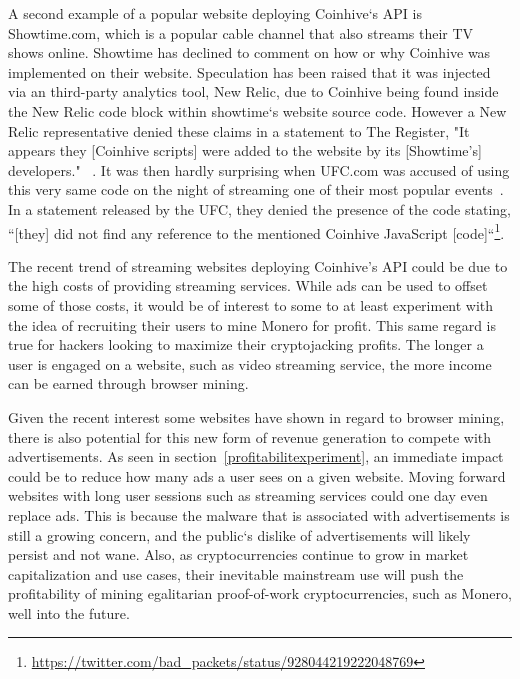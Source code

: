A second example of a popular website deploying Coinhive`s API is Showtime.com, which is a popular cable channel that also streams their TV shows online. Showtime has declined to comment on how or why Coinhive was implemented on their website. Speculation has been raised that it was injected via an third-party analytics tool, New Relic, due to Coinhive being found inside the New Relic code block within showtime`s website source code. However a New Relic representative denied these claims in a statement to The Register, "It appears they [Coinhive scripts] were added to the website by its [Showtime's] developers." ~\cite{registershowtime}. 
It was then hardly surprising when UFC.com was accused of using this very same code on the night of streaming one of their most popular events~\cite{registerufcmonero}. In a statement released by the UFC, they denied the presence of the code stating, ``[they] did not find any reference to the mentioned Coinhive JavaScript [code]``\footnote{\url{https://twitter.com/bad_packets/status/928044219222048769}}.
 
The recent trend of streaming websites deploying Coinhive's API could be due to the high costs of providing streaming services. While ads can be used to offset some of those costs, it would be of interest to some to at least experiment with the idea of recruiting their users to mine Monero for profit. This same regard is true for hackers looking to maximize their cryptojacking profits. The longer a user is engaged on a website, such as video streaming service, the more income can be earned through browser mining.

Given the recent interest some websites have shown in regard to browser mining, there is also potential for this new form of revenue generation to compete with advertisements. As seen in section~\ref{profitabilitexperiment}, an immediate impact could be to reduce how many ads a user sees on a given website. Moving forward websites with long user sessions such as streaming services could one day even replace ads. This is because the malware that is associated with advertisements is still a growing concern, and the public`s dislike of advertisements will likely persist and not wane. Also, as cryptocurrencies continue to grow in market capitalization and use cases, their inevitable mainstream use will push the profitability of mining egalitarian proof-of-work cryptocurrencies, such as Monero, well into the future. 





















